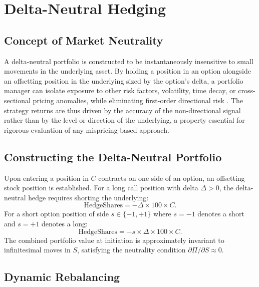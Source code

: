 \documentclass[10pt,twocolumn]{article}
\begin{document}
\section{Delta-Neutral Hedging}

\subsection{Concept of Market Neutrality}

A delta-neutral portfolio is constructed to be instantaneously insensitive
to small movements in the underlying asset. By holding a position in an
option alongside an offsetting position in the underlying sized by the
option's delta, a portfolio manager can isolate exposure to other
risk factors, volatility, time decay, or cross-sectional pricing
anomalies, while eliminating first-order directional risk
\cite{hull2018}. The strategy returns are thus driven by the accuracy
of the non-directional signal rather than by the level or direction of
the underlying, a property essential for rigorous evaluation of any
mispricing-based approach.

\subsection{Constructing the Delta-Neutral Portfolio}

Upon entering a position in $C$ contracts on one side of an option, an
offsetting stock position is established. For a long call position with
delta $\Delta > 0$, the delta-neutral hedge requires shorting the
underlying:
%
\begin{equation}
\text{HedgeShares} = -\Delta \times 100 \times C.
\end{equation}
%
For a short option position of side $s \in \{-1, +1\}$ where $s = -1$
denotes a short and $s = +1$ denotes a long:
%
\begin{equation}
\text{HedgeShares} = -s \times \Delta \times 100 \times C.
\end{equation}
%
The combined portfolio value at initiation is approximately invariant to
infinitesimal moves in $S$, satisfying the neutrality condition
$\partial \Pi / \partial S \approx 0$.

\subsection{Dynamic Rebalancing}
\end{document}
